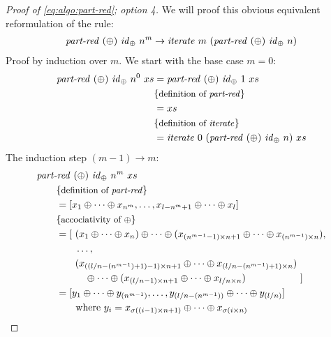 \begin{proof}[Proof of \autoref{eq:algo:part-red}; option 4]
  We will proof this obvious equivalent reformulation of the rule:
  \begin{align*}
    \partRed\ (\oplus)\ \id_\oplus\ n^m \rightarrow \iterateN\ m\ (\partRed\ (\oplus)\ \id_\oplus\ n)
  \end{align*}
  Proof by induction over $m$. We start with the base case $m= 0$:
  \begin{align*}
    \partRed\ (\oplus)\ \id_\oplus\ n^0\ xs &= \partRed\ (\oplus)\ \id_\oplus\ 1\ xs\\
      & \comment{definition of \partRed}\\
      &= xs\\
      &\comment{definition of \iterateN}\\
      &= \iterateN\ 0\ (\partRed\ (\oplus)\ \id_\oplus\ n)\ xs\\
  \end{align*}
  The induction step $(m-1) \rightarrow m$:
  \begin{align*}
    &\partRed\ (\oplus)\ \id_\oplus\ n^m\ xs\\
    &\qquad \comment{definition of \partRed}\\
    &\qquad = [x_1 \oplus \dots \oplus x_{n^m}, \ldots, x_{l-n^m+1} \oplus \dots \oplus x_l]\\
    &\qquad \comment{accociativity of $\oplus$}\\
    &\qquad = \begin{aligned}[t]
       [\ &(x_1 \oplus \dots \oplus x_n) \oplus \dots \oplus (x_{(n^{m-1}-1)\times n +1} \oplus \dots \oplus x_{(n^{m-1})\times n}),\\
        &\ldots,\\
        &
          \begin{aligned}[b]
            &(x_{((l/n-(n^{m-1})+1)-1)\times n + 1} \oplus \dots \oplus x_{(l/n-(n^{m-1})+1)\times n})\\
            &\quad \oplus \dots \oplus (x_{(l/n-1)\times n + 1} \oplus \dots \oplus x_{l/n\times n})
          \end{aligned}\ ]\\
      \end{aligned}\\
    &\qquad = [y_1 \oplus \dots \oplus y_{(n^{m-1})}, \ldots, y_{(l/n - (n^{m-1}))} \oplus \dots \oplus y_{(l/n)}]\\
    &\qquad\qquad \text{where}\ y_i = x_{\sigma((i-1)\times n + 1)} \oplus \dots \oplus x_{\sigma(i\times n)}\\

\end{align*}
\end{proof}
